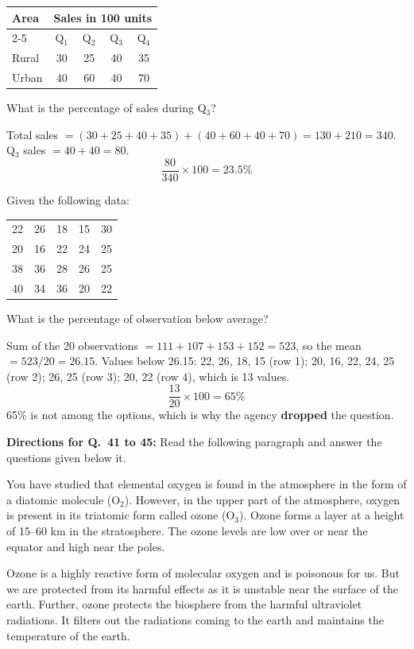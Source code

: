 \begin{tabular}{lcccc}\toprule
\textbf{Area} & \multicolumn{4}{c}{\textbf{Sales in 100 units}}\\\cmidrule(l){2-5}
& Q$_1$ & Q$_2$ & Q$_3$ & Q$_4$\\\midrule
Rural & 30 & 25 & 40 & 35\\ Urban & 40 & 60 & 40 & 70\\\bottomrule
\end{tabular}

What is the percentage of sales during Q$_3$?

Total sales $=(30+25+40+35)+(40+60+40+70)=130+210=340$.\\
Q$_3$ sales $=40+40=80$.
\[\frac{80}{340}\times100=\mathbf{23.5\%}\]

Given the following data:
\begin{center}
\begin{tabular}{ccccc}
22 & 26 & 18 & 15 & 30\\ 20 & 16 & 22 & 24 & 25\\ 38 & 36 & 28 & 26 & 25\\ 40 & 34 & 36 & 20 & 22\\
\end{tabular}
\end{center}
What is the percentage of observation below average?

Sum of the 20 observations $=111+107+153+152=523$, so the mean $=523/20=26.15$.
Values below 26.15: 22, 26, 18, 15 (row 1); 20, 16, 22, 24, 25 (row 2); 26, 25 (row 3); 20, 22 (row 4), which is 13 values.
\[\frac{13}{20}\times100=65\%\]
65\% is not among the options, which is why the agency \textbf{dropped} the question.

\textbf{Directions for Q.~41 to 45:} Read the following paragraph and answer the questions given below it.\par\smallskip
You have studied that elemental oxygen is found in the atmosphere in the form of a diatomic molecule (O$_2$). However, in the upper part of the atmosphere, oxygen is present in its triatomic form called ozone (O$_3$). Ozone forms a layer at a height of 15--60 km in the stratosphere. The ozone levels are low over or near the equator and high near the poles.

Ozone is a highly reactive form of molecular oxygen and is poisonous for us. But we are protected from its harmful effects as it is unstable near the surface of the earth. Further, ozone protects the biosphere from the harmful ultraviolet radiations. It filters out the radiations coming to the earth and maintains the temperature of the earth.

